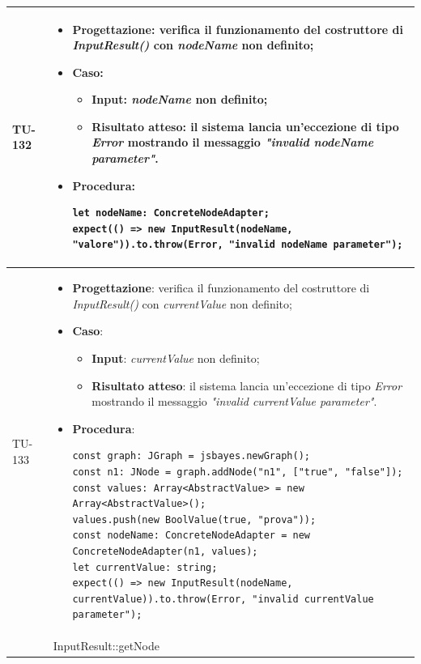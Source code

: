\begin{longtable}{|C{1.5cm}|C{14.5cm}|}
\\ \hline
{TU-132} &
\begin{itemize}
	\item \textbf{Progettazione}: verifica il funzionamento del costruttore di \emph{InputResult()} con \emph{nodeName} non definito;
	\item \textbf{Caso}: 
	\begin{itemize}
		\item \textbf{Input}: \emph{nodeName} non definito;
		\item \textbf{Risultato atteso}: il sistema lancia un'eccezione di tipo \emph{Error} mostrando il messaggio \emph{"invalid nodeName parameter"}.
	\end{itemize}
	\item \textbf{Procedura}:
	\begin{lstlisting}
let nodeName: ConcreteNodeAdapter;
expect(() => new InputResult(nodeName, "valore")).to.throw(Error, "invalid nodeName parameter");
	\end{lstlisting}
\end{itemize}\\
\hline
{TU-133} &
\begin{itemize}
	\item \textbf{Progettazione}: verifica il funzionamento del costruttore di \emph{InputResult()} con \emph{currentValue} non definito;
	\item \textbf{Caso}: 
	\begin{itemize}
		\item \textbf{Input}: \emph{currentValue} non definito;
		\item \textbf{Risultato atteso}: il sistema lancia un'eccezione di tipo \emph{Error} mostrando il messaggio \emph{"invalid currentValue parameter"}.
	\end{itemize}
	\item \textbf{Procedura}:
	\begin{lstlisting}
const graph: JGraph = jsbayes.newGraph();
const n1: JNode = graph.addNode("n1", ["true", "false"]);
const values: Array<AbstractValue> = new Array<AbstractValue>();
values.push(new BoolValue(true, "prova"));
const nodeName: ConcreteNodeAdapter = new ConcreteNodeAdapter(n1, values);
let currentValue: string;
expect(() => new InputResult(nodeName, currentValue)).to.throw(Error, "invalid currentValue parameter");
	\end{lstlisting}
\end{itemize}\\
\hline
{} & InputResult::getNode

\end{longtable}
